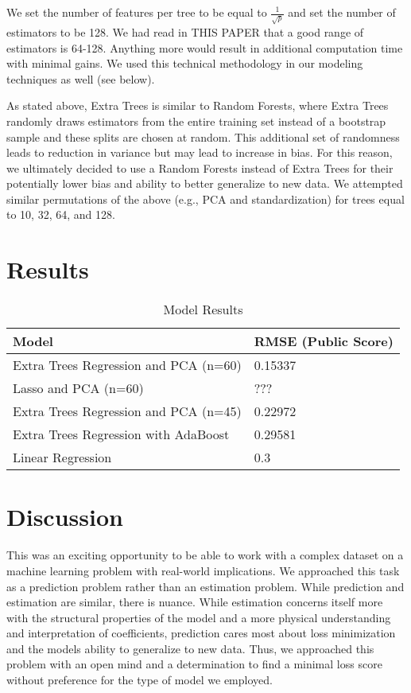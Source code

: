\documentclass[11pt, oneside]{article}   	%
\begin{document}
We set the number of features per tree to be equal to $\frac{1}{\sqrt{p}}$ and set the number of estimators to be 128. We had read in THIS PAPER that a good range of estimators is 64-128. Anything more would result in additional computation time with minimal gains. We used this technical methodology in our modeling techniques as well (see below).

As stated above, Extra Trees is similar to Random Forests, where Extra Trees randomly draws estimators from the entire training set instead of a bootstrap sample and these splits are chosen at random. This additional set of randomness leads to reduction in variance but may lead to increase in bias. For this reason, we ultimately decided to use a Random Forests instead of Extra Trees for their potentially lower bias and ability to better generalize to new data. We attempted similar permutations of the above (e.g., PCA and standardization) for trees equal to 10, 32, 64, and 128.

\section{Results}

\begin{table}[]
\centering

\label{my-label}
\begin{tabular}{@{}ll@{}}
\toprule
\textbf{Model} & \textbf{RMSE (Public Score)} \\ \midrule
Extra Trees Regression and PCA (n=60)  & 0.15337  \\
Lasso and PCA (n=60)  & ???  \\
Extra Trees Regression and PCA (n=45)   & 0.22972  \\
Extra Trees Regression with AdaBoost  & 0.29581  \\
Linear Regression & 0.3  \\ \bottomrule
\end{tabular}
\caption{Model Results}
\end{table}

\section{Discussion}
This was an exciting opportunity to be able to work with a complex dataset on a machine learning problem with real-world implications. We approached this task as a prediction problem rather than an estimation problem. While prediction and estimation are similar, there is nuance. While estimation concerns itself more with the structural properties of the model and a more physical understanding and interpretation of coefficients, prediction cares most about loss minimization and the models ability to generalize to new data. Thus, we approached this problem with an open mind and a determination to find a minimal loss score without preference for the type of model we employed. 
\end{document}
